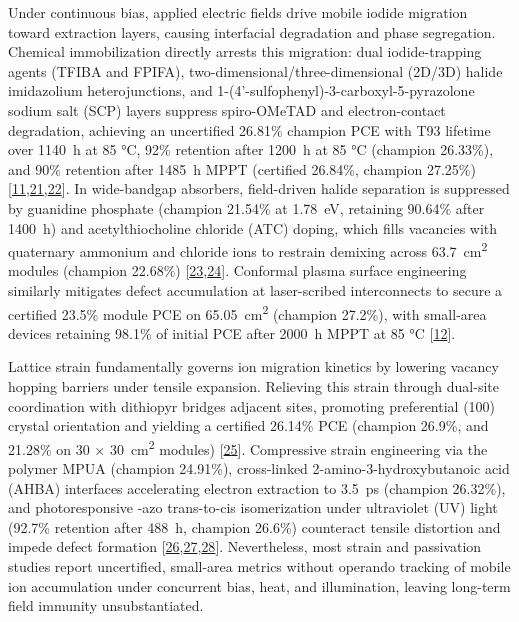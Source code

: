 \documentclass[
  11pt,
]{article}
\begin{document}
Under continuous bias, applied electric fields drive mobile iodide
migration toward extraction layers, causing interfacial degradation and
phase segregation. Chemical immobilization directly arrests this
migration: dual iodide-trapping agents (TFIBA and FPIFA),
two-dimensional/three-dimensional (2D/3D) halide imidazolium
heterojunctions, and 1-(4'-sulfophenyl)-3-carboxyl-5-pyrazolone sodium
salt (SCP) layers suppress spiro-OMeTAD and electron-contact
degradation, achieving an uncertified 26.81\% champion PCE with T93
lifetime over \qty{1140}{\hour} at 85 °C, 92\% retention after
\qty{1200}{\hour} at 85 °C (champion 26.33\%), and 90\% retention after
\qty{1485}{\hour} MPPT (certified 26.84\%, champion 27.25\%)
{[}\href{https://doi.org/10.1002/aenm.71305}{11},\href{https://doi.org/10.1002/anie.2924886}{21},\href{https://doi.org/10.1002/adfm.77015}{22}{]}.
In wide-bandgap absorbers, field-driven halide separation is suppressed
by guanidine phosphate (champion 21.54\% at \qty{1.78}{\electronvolt},
retaining 90.64\% after \qty{1400}{\hour}) and acetylthiocholine
chloride (ATC) doping, which fills vacancies with quaternary ammonium
and chloride ions to restrain demixing across
\qty{63.7}{\centi\meter\squared} modules (champion 22.68\%)
{[}\href{https://doi.org/10.1002/cnl2.70189}{23},\href{https://doi.org/10.1002/ece2.70102}{24}{]}.
Conformal plasma surface engineering similarly mitigates defect
accumulation at laser-scribed interconnects to secure a certified 23.5\%
module PCE on \qty{65.05}{\centi\meter\squared} (champion 27.2\%), with
small-area devices retaining 98.1\% of initial PCE after
\qty{2000}{\hour} MPPT at 85 °C
{[}\href{https://doi.org/10.1126/science.aeg1730}{12}{]}.

Lattice strain fundamentally governs ion migration kinetics by lowering
vacancy hopping barriers under tensile expansion. Relieving this strain
through dual-site coordination with dithiopyr bridges adjacent
 sites, promoting preferential (100) crystal orientation and
yielding a certified 26.14\% PCE (champion 26.9\%, and 21.28\% on 30 ×
\qty{30}{\centi\meter\squared} modules)
{[}\href{https://doi.org/10.1002/adma.74033}{25}{]}. Compressive strain
engineering via the polymer MPUA (champion 24.91\%), cross-linked
2-amino-3-hydroxybutanoic acid (AHBA) interfaces accelerating electron
extraction to \qty{3.5}{\pico\second} (champion 26.32\%), and
photoresponsive -azo trans-to-cis isomerization under
ultraviolet (UV) light (92.7\% retention after \qty{488}{\hour},
champion 26.6\%) counteract tensile distortion and impede defect
formation
{[}\href{https://doi.org/10.1002/solr.70435}{26},\href{https://doi.org/10.1002/adfm.77373}{27},\href{https://doi.org/10.1002/adma.74220}{28}{]}.
Nevertheless, most strain and passivation studies report uncertified,
small-area metrics without operando tracking of mobile ion accumulation
under concurrent bias, heat, and illumination, leaving long-term field
immunity unsubstantiated.
\end{document}

